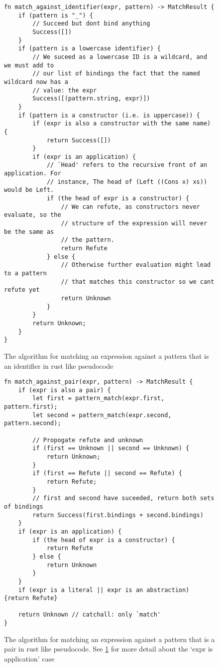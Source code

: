 \begin{figure}[h]
    \begin{lstlisting}[language=Rust_boxed]
fn match_against_identifier(expr, pattern) -> MatchResult {
    if (pattern is "_") {
        // Succeed but dont bind anything
        Success([])
    }
    if (pattern is a lowercase identifier) {
        // We suceed as a lowercase ID is a wildcard, and we must add to 
        // our list of bindings the fact that the named wildcard now has a 
        // value: the expr
        Success([(pattern.string, expr)])
    }
    if (pattern is a constructor (i.e. is uppercase)) {
        if (expr is also a constructor with the same name) {
            return Success([])
        }
        if (expr is an application) {
            // `Head' refers to the recursive front of an application. For 
            // instance, The head of (Left ((Cons x) xs)) would be Left.
            if (the head of expr is a constructor) {
                // We can refute, as constructors never evaluate, so the 
                // structure of the expression will never be the same as
                // the pattern. 
                return Refute
            } else {
                // Otherwise further evaluation might lead to a pattern 
                // that matches this constructor so we cant refute yet
                return Unknown
            }
        }
        return Unknown;
    }
}
    \end{lstlisting}
    \caption{The algorithm for matching an expression against a pattern that is an identifier in rust like pseudocode}
    \label{fig:pattern_list_id}
\end{figure}

\begin{figure}[h]
    \begin{lstlisting}[language=Rust_boxed]
fn match_against_pair(expr, pattern) -> MatchResult {
    if (expr is also a pair) {
        let first = pattern_match(expr.first, pattern.first);
        let second = pattern_match(expr.second, pattern.second);

        // Propogate refute and unknown
        if (first == Unknown || second == Unknown) {
            return Unknown;
        }
        if (first == Refute || second == Refute) {
            return Refute;
        }
        // first and second have suceeded, return both sets of bindings
        return Success(first.bindings + second.bindings)
    }
    if (expr is an application) {
        if (the head of expr is a constructor) {
            return Refute
        } else {
            return Unknown
        }
    }
    if (expr is a literal || expr is an abstraction) {return Refute}    
    
    return Unknown // catchall: only `match'
}
\end{lstlisting}
    \caption{The algorithm for matching an expression against a pattern that is a pair in rust like pseudocode. See \ref{fig:pattern_list_id} for more detail about the `expr is application' case}
    \label{fig:pattern_list_pair}
\end{figure}

